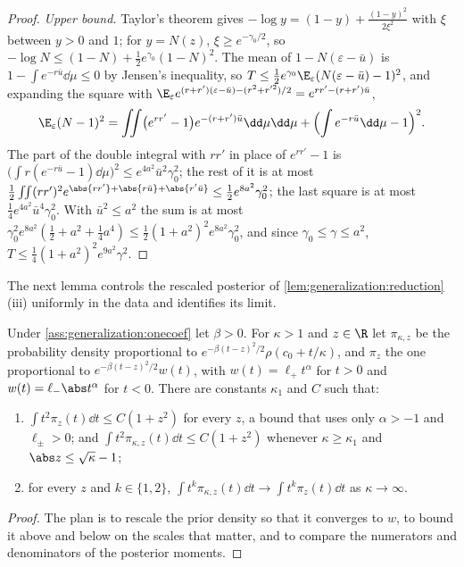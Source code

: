 \begin{refsection}
\begin{proof}
\emph{Upper bound.} Taylor's theorem gives $-\log y=(1-y)+\frac{(1-y)^2}{2\xi^2}$ with $\xi$ between $y>0$ and $1$; for $y=N(z)$, $\xi\ge e^{-\gamma_0/2}$, so $-\log N\le(1-N)+\frac12e^{\gamma_0}(1-N)^2$. The mean of $1-N(\varepsilon-\bar u)$ is $1-\int e^{-r\bar u}\dd\mu\le0$ by Jensen's inequality, so $T\le\frac12e^{\gamma_0}\E_\varepsilon(N(\varepsilon-\bar u)-1)^2$, and expanding the square with $\E_\varepsilon e^{(r+r')(\varepsilon-\bar u)-(r^2+r'^2)/2}=e^{rr'-(r+r')\bar u}$,
\[
\E_\varepsilon(N-1)^2=\iint\bigl(e^{rr'}-1\bigr)e^{-(r+r')\bar u}\dd\mu\dd\mu+\Bigl(\int e^{-r\bar u}\dd\mu-1\Bigr)^2 .
\]
The part of the double integral with $rr'$ in place of $e^{rr'}-1$ is $\bigl(\int r(e^{-r\bar u}-1)\dd\mu\bigr)^2\le e^{4a^2}\bar u^2\gamma_0^2$; the rest of it is at most $\frac12\iint(rr')^2e^{\abs{rr'}+\abs{r\bar u}+\abs{r'\bar u}}\le\frac12e^{8a^2}\gamma_0^2$; the last square is at most $\frac14e^{4a^2}\bar u^4\gamma_0^2$. With $\bar u^2\le a^2$ the sum is at most $\gamma_0^2e^{8a^2}(\frac12+a^2+\frac14a^4)\le\frac12(1+a^2)^2e^{8a^2}\gamma_0^2$, and since $\gamma_0\le\gamma\le a^2$, $T\le\frac14(1+a^2)^2e^{9a^2}\gamma^2$.
\end{proof}

The next lemma controls the rescaled posterior of \cref{lem:generalization:reduction}(iii) uniformly in the data and identifies its limit.

\begin{lemma}\label{lem:generalization:posterior}
Under \cref{ass:generalization:onecoef} let $\beta>0$. For $\kappa>1$ and $z\in\R$ let $\pi_{\kappa,z}$ be the probability density proportional to $e^{-\beta(t-z)^2/2}\rho(c_0+t/\kappa)$, and $\pi_z$ the one proportional to $e^{-\beta(t-z)^2/2}w(t)$, with $w(t)=\ell_+t^\alpha$ for $t>0$ and $w(t)=\ell_-\abs t^\alpha$ for $t<0$. There are constants $\kappa_1$ and $C$ such that:
\begin{enumerate}[label=(\roman*),nosep]
\item $\int t^2\pi_z(t)\dd t\le C(1+z^2)$ for every $z$, a bound that uses only $\alpha>-1$ and $\ell_\pm>0$; and $\int t^2\pi_{\kappa,z}(t)\dd t\le C(1+z^2)$ whenever $\kappa\ge\kappa_1$ and $\abs z\le\sqrt\kappa-1$;
\item for every $z$ and $k\in\{1,2\}$, $\int t^k\pi_{\kappa,z}(t)\dd t\to\int t^k\pi_z(t)\dd t$ as $\kappa\to\infty$.
\end{enumerate}
\end{lemma}

\begin{proof}
The plan is to rescale the prior density so that it converges to $w$, to bound it above and below on the scales that matter, and to compare the numerators and denominators of the posterior moments.


\end{proof}
\end{refsection}
